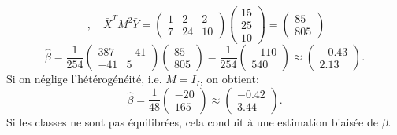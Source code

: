 \documentclass{../headers/td_upc}
\providecommand{\1}{\mathds{1}}
\begin{document}
\begin{enumerate}
{\[		\;,\quad
		\bar{X}^T M^2 \bar Y 
		= \begin{pmatrix} 1 & 2 & 2 \\ 7 & 24 & 10 \end{pmatrix}
		\begin{pmatrix} 15 \\ 25 \\ 10 \end{pmatrix}
		= \begin{pmatrix} 85 \\ 805 \end{pmatrix}
		\]
		\[
		\hat \beta
		= \frac{1}{254} \begin{pmatrix} 387 & -41 \\ -41 & 5 \end{pmatrix}
		\begin{pmatrix} 85 \\ 805 \end{pmatrix}
		= \frac{1}{254} \begin{pmatrix} -110 \\ 540 \end{pmatrix}
		\approx
		\begin{pmatrix} -0.43 \\ 2.13 \end{pmatrix}.
		\]
		Si on néglige l'hétérogénéité, i.e. $M = I_I$, on obtient:
		\[
		\hat \beta
		= \frac{1}{48} \begin{pmatrix} -20 \\ 165 \end{pmatrix}
		\approx
		\begin{pmatrix} -0.42 \\ 3.44 \end{pmatrix}.
		\]
		Si les classes ne sont pas équilibrées, cela conduit à une estimation
		biaisée de $\beta$.
		}
	\end{enumerate}
	
	\cor{\newpage}
\end{document}
